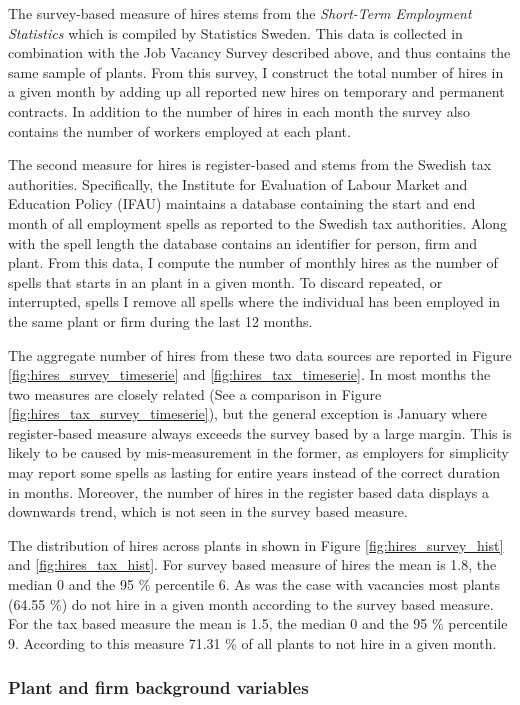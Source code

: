 The survey-based measure of hires stems from the \emph{Short-Term Employment Statistics} which is compiled by Statistics Sweden. This data is collected in combination with the Job Vacancy Survey described above, and thus contains the same sample of plants. From this survey, I construct the total number of hires in a given month by adding up all reported new hires on temporary and permanent contracts. In addition to the number of hires in each month the survey also contains the number of workers employed at each plant.

The second measure for hires is register-based and stems from the Swedish tax authorities. Specifically, the Institute for Evaluation of Labour Market and Education Policy (IFAU) maintains a database containing the start and end month of all employment spells as reported to the Swedish tax authorities. Along with the spell length the database contains an identifier for person, firm and plant. From this data, I compute the number of monthly hires as the number of spells that starts in an plant in a given month. To discard repeated, or interrupted, spells I remove all spells where the individual has been employed in the same plant or firm during the last 12 months. 

The aggregate number of hires from these two data sources are reported in Figure \ref{fig:hires_survey_timeserie} and \ref{fig:hires_tax_timeserie}. In most months the two measures are closely related (See a comparison in Figure \ref{fig:hires_tax_survey_timeserie}), but the general exception is January where register-based measure always exceeds the survey based by a large margin. This is likely to be caused by mis-measurement in the former, as employers for simplicity may report some spells as lasting for entire years instead of the correct duration in months. Moreover, the number of hires in the register based data displays a downwards trend, which is not seen in the survey based measure.

The distribution of hires across plants in shown in Figure \ref{fig:hires_survey_hist} and \ref{fig:hires_tax_hist}. For survey based measure of hires the mean is 1.8, the median 0 and the 95 \% percentile 6. As was the case with vacancies most plants (64.55 \%) do not hire in a given month according to the survey based measure. For the tax based measure the mean is 1.5, the median 0 and the 95 \% percentile 9. According to this measure 71.31 \% of all plants to not hire in a given month.

\subsubsection{Plant and firm background variables}


